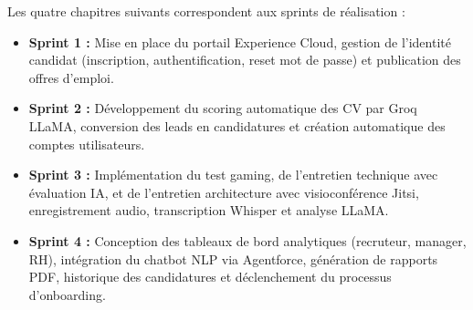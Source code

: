 \medskip
Les quatre chapitres suivants correspondent aux sprints de réalisation :
\begin{itemize}
    \item \textbf{Sprint 1 :} Mise en place du portail Experience Cloud, gestion
    de l'identité candidat (inscription, authentification, reset mot de passe)
    et publication des offres d'emploi.
    \item \textbf{Sprint 2 :} Développement du scoring automatique des CV par
    Groq LLaMA, conversion des leads en candidatures et création automatique
    des comptes utilisateurs.
    \item \textbf{Sprint 3 :} Implémentation du test gaming, de l'entretien
    technique avec évaluation IA, et de l'entretien architecture avec
    visioconférence Jitsi, enregistrement audio, transcription Whisper et
    analyse LLaMA.
    \item \textbf{Sprint 4 :} Conception des tableaux de bord analytiques
    (recruteur, manager, RH), intégration du chatbot NLP via Agentforce,
    génération de rapports PDF, historique des candidatures et
    déclenchement du processus d'onboarding.
\end{itemize}
